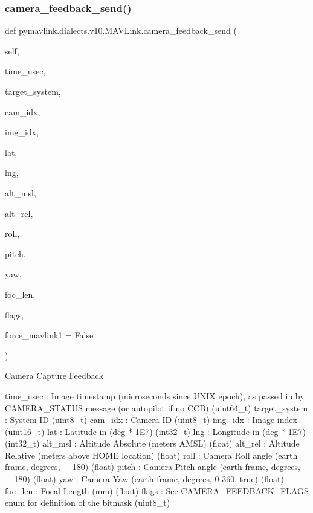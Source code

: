 \begin{DoxyVerb}
\begin{DoxyVerb}
\subsubsection{\texorpdfstring{camera\+\_\+feedback\+\_\+send()}{camera\_feedback\_send()}}
{\footnotesize\ttfamily def pymavlink.\+dialects.\+v10.\+M\+A\+V\+Link.\+camera\+\_\+feedback\+\_\+send (\begin{DoxyParamCaption}\item[{}]{self,  }\item[{}]{time\+\_\+usec,  }\item[{}]{target\+\_\+system,  }\item[{}]{cam\+\_\+idx,  }\item[{}]{img\+\_\+idx,  }\item[{}]{lat,  }\item[{}]{lng,  }\item[{}]{alt\+\_\+msl,  }\item[{}]{alt\+\_\+rel,  }\item[{}]{roll,  }\item[{}]{pitch,  }\item[{}]{yaw,  }\item[{}]{foc\+\_\+len,  }\item[{}]{flags,  }\item[{}]{force\+\_\+mavlink1 = {\ttfamily False} }\end{DoxyParamCaption})}

\begin{DoxyVerb}Camera Capture Feedback

time_usec                 : Image timestamp (microseconds since UNIX epoch), as passed in by CAMERA_STATUS message (or autopilot if no CCB) (uint64_t)
target_system             : System ID (uint8_t)
cam_idx                   : Camera ID (uint8_t)
img_idx                   : Image index (uint16_t)
lat                       : Latitude in (deg * 1E7) (int32_t)
lng                       : Longitude in (deg * 1E7) (int32_t)
alt_msl                   : Altitude Absolute (meters AMSL) (float)
alt_rel                   : Altitude Relative (meters above HOME location) (float)
roll                      : Camera Roll angle (earth frame, degrees, +-180) (float)
pitch                     : Camera Pitch angle (earth frame, degrees, +-180) (float)
yaw                       : Camera Yaw (earth frame, degrees, 0-360, true) (float)
foc_len                   : Focal Length (mm) (float)
flags                     : See CAMERA_FEEDBACK_FLAGS enum for definition of the bitmask (uint8_t)\end{DoxyVerb}
 \mbox{\label{classpymavlink_1_1dialects_1_1v10_1_1MAVLink_a584d2dd9e921bb5e76ce62b7a88c62f7}} 

\end{DoxyVerb}
\end{DoxyVerb}
